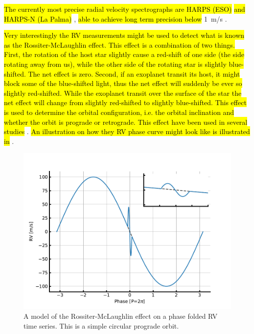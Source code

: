 \hl{The currently most precise radial velocity spectrographs are HARPS (ESO)} \citep{HARPS} \hl{and
HARPS-N (La Palma)} \citep{HARPSN}, \hl{able to achieve long term precision below} \SI{1}{m/s}
\citep[see e.g.][]{Pepe2013}.

\hl{Very interestingly the RV measurements might be used to detect what is known as the
Rossiter-McLaughlin effect. This effect is a combination of two things. First, the rotation of the
host star slightly cause a red-shift of one side (the side rotating away from us), while the other
side of the rotating star is slightly blue-shifted. The net effect is zero. Second, if an exoplanet
transit its host, it might block some of the blue-shifted light, thus the net effect will suddenly
be ever so slightly red-shifted. While the exoplanet transit over the surface of the star the net
effect will change from slightly red-shifted to slightly blue-shifted. This effect is used to
determine the orbital configuration, i.e. the orbital inclination and whether the orbit is prograde
or retrograde. This effect have been used in several studies} \citep[][to mention just a
few]{Winn2005,Triaud2010}. \hl{An illustration on how they RV phase curve might look like is
illustrated in} .

\begin{figure}[htpb!]
    \centering
    \includegraphics[width=1.0\linewidth]{figures/RMeffect.pdf}
    \caption{A model of the Rossiter-McLaughlin effect on a phase folded RV time series. This is a
             simple circular prograde orbit.}
    \label{fig:RMeffect}
\end{figure}

